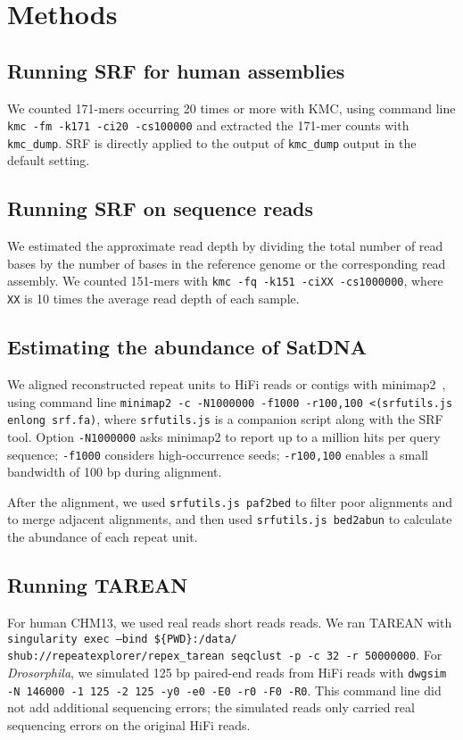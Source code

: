 \documentclass{bioinfo}
\begin{document}
\section{Methods}

\subsection{Running SRF for human assemblies}

We counted 171-mers occurring 20 times or more with KMC, using command line
{\tt kmc -fm -k171 -ci20 -cs100000} and extracted the 171-mer counts with
{\tt kmc\_dump}. SRF is directly applied to the output of {\tt kmc\_dump}
output in the default setting.

\subsection{Running SRF on sequence reads}

We estimated the approximate read depth by dividing the total number of read
bases by the number of bases in the reference genome or the corresponding
read assembly. We counted 151-mers with {\tt kmc -fq -k151 -ciXX -cs1000000},
where {\tt XX} is 10 times the average read depth of each sample.

\subsection{Estimating the abundance of SatDNA}

We aligned reconstructed repeat units to HiFi reads or contigs with
minimap2~\citep{Li:2018ab}, using command line {\tt minimap2 -c -N1000000
-f1000 -r100,100 <(srfutils.js enlong srf.fa)}, where {\tt srfutils.js} is a
companion script along with the SRF tool. Option {\tt -N1000000} asks minimap2
to report up to a million hits per query sequence; {\tt -f1000} considers
high-occurrence seeds; {\tt -r100,100} enables a small bandwidth of 100 bp
during alignment.

After the alignment, we used {\tt srfutils.js paf2bed} to filter poor
alignments and to merge adjacent alignments, and then used {\tt srfutils.js
bed2abun} to calculate the abundance of each repeat unit.

\subsection{Running TAREAN}

For human CHM13, we used real reads short reads reads. We ran TAREAN with {\tt
singularity exec --bind \$\{PWD\}:/data/ shub://repeatexplorer/repex\_tarean
seqclust -p -c 32 -r 50000000}. For \emph{Drosorphila}, we simulated 125 bp
paired-end reads from HiFi reads with {\tt dwgsim -N 146000 -1 125 -2 125 -y0
-e0 -E0 -r0 -F0 -R0}. This command line did not add additional sequencing
errors; the simulated reads only carried real sequencing errors on the original
HiFi reads.
\end{document}
